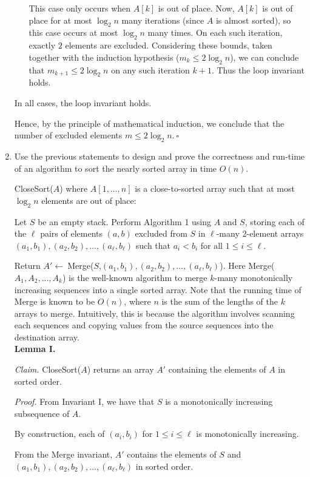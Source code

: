 \begin{enumerate}
\begin{solution}
\begin{itemize}
This case only occurs when $A[k]$ is out of place. Now, $A[k]$ is out of place for at most $\log_2n$ many iterations (since $A$ is almost sorted), so this case occurs at most $\log_2n$ many times. On each such iteration, exactly $2$ elements are excluded. Considering these bounds, taken together with the induction hypothesis ($m_k\leq 2\log_2n$), we can conclude that $m_{k+1}\leq 2\log_2n$ on any such iteration $k+1$. Thus the loop invariant holds.
\end{itemize}
In all cases, the loop invariant holds.

Hence, by the principle of mathematical induction, we conclude that the number of excluded elements $m\leq 2\log_2n$.$~\square$
\end{solution}
\newpage\item Use the previous statements to design and prove the correctness and run-time of an algorithm to sort the nearly sorted array in time $O(n)$.
\begin{solution}{\sc CloseSort}($A$) where $A[1,\dots,n]$ is a close-to-sorted array such that at most $\log_2n$ elements are out of place:

Let $S$ be an empty stack. Perform Algorithm 1 using $A$ and $S$, storing each of the $\ell$ pairs of elements $(a,b)$ excluded from $S$ in $\ell$-many $2$-element arrays $(a_1,b_1),(a_2,b_2),\dots,(a_\ell,b_\ell)$ such that $a_i<b_i$ for all $1\leq i\leq\ell$. 

Return $A'\leftarrow~${\sc Merge}($S$,$(a_1,b_1),(a_2,b_2),\dots,(a_\ell,b_\ell)$). Here {\sc Merge}($A_1,A_2,\dots,A_k$) is the well-known algorithm to merge $k$-many monotonically increasing sequences into a single sorted array. Note that the running time of {\sc Merge} is known to be $O(n)$, where $n$ is the sum of the lengths of the $k$ arrays to merge. Intuitively, this is because the algorithm involves scanning each sequences and copying values from the source sequences into the destination array.\\

\textbf{Lemma I.}

\textit{Claim. }{\sc CloseSort}($A$) returns an array $A'$ containing the elements of $A$ in sorted order.

\textit{Proof. }
From Invariant I, we have that $S$ is a monotonically increasing subsequence of $A$.

By construction, each of $(a_i,b_i)$ for $1\leq i\leq\ell$ is monotonically increasing.

From the {\sc Merge} invariant, $A'$ contains the elements of $S$ and $(a_1,b_1),(a_2,b_2),\dots,(a_\ell,b_\ell)$ in sorted order.


\end{solution}
\end{enumerate}
